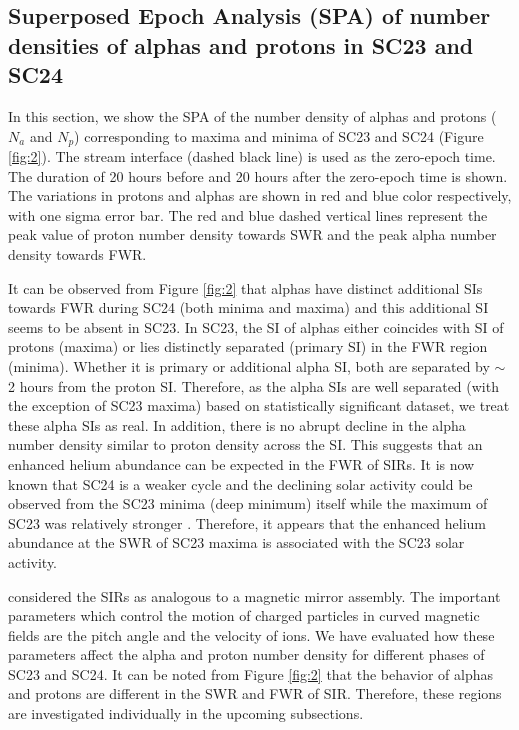 \documentclass[letters,usenatbib]{mnras}
\begin{document}
\subsection{Superposed Epoch Analysis (SPA) of number densities of alphas and protons in SC23 and SC24}

In this section, we show the SPA of the number density of alphas and protons ($N_a$ and $N_p$) corresponding to maxima and minima of SC23 and SC24 (Figure \ref{fig:2}).  The stream interface (dashed black line) is used as the zero-epoch time. The duration of 20 hours before and 20 hours after the zero-epoch time is shown. The variations in protons and alphas are shown in red and blue color respectively, with one sigma error bar. The red and blue dashed vertical lines represent the peak value of proton number density towards SWR and the peak alpha number density towards FWR.   


It can be observed from Figure \ref{fig:2} that alphas have distinct additional SIs towards FWR during SC24 (both minima and maxima) and this additional SI seems to be absent in SC23. In SC23, the SI of alphas either coincides with SI of protons (maxima) or lies distinctly separated (primary SI) in the FWR region (minima). Whether it is primary or additional alpha SI, both are separated  by $\sim$ 2 hours from the proton SI. Therefore, as the alpha SIs are well separated  (with the exception of SC23 maxima) based on statistically significant dataset, we treat these alpha SIs as real. In addition, there is no abrupt decline in the alpha number density similar to proton density across the SI. This suggests that an enhanced helium abundance can be expected in the FWR of SIRs. It is now known that SC24 is a weaker cycle and the declining solar activity could be observed from the SC23 minima (deep minimum) itself while the maximum of SC23 was relatively stronger \citep{Hathaway2015}. Therefore, it appears that the enhanced helium abundance at the SWR of SC23 maxima is associated with the SC23 solar activity.

\cite{Durovcova2019} considered the SIRs as analogous to a magnetic mirror assembly. The important parameters which control the motion of charged particles in curved magnetic fields are the pitch angle and the velocity of ions.  We have evaluated how these parameters affect the alpha and proton number density for different phases of SC23 and SC24. It can be noted from Figure \ref{fig:2} that the behavior of alphas and protons are different in the SWR and FWR of SIR. Therefore, these regions are investigated individually in the upcoming subsections.
\end{document}
